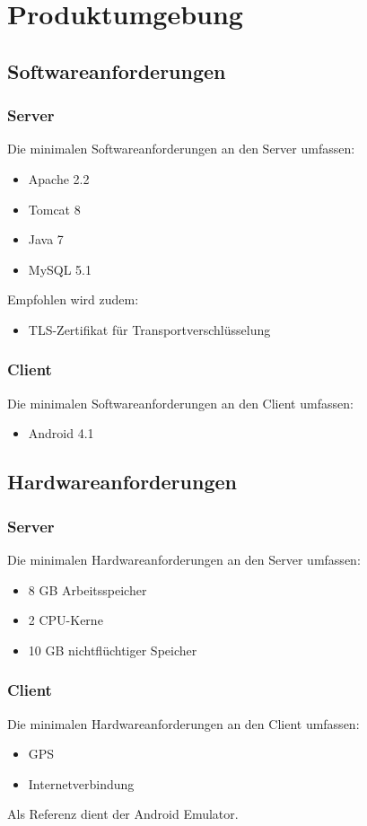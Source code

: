 \section{Produktumgebung}
\subsection{Softwareanforderungen}

\subsubsection{Server}
Die minimalen Softwareanforderungen an den Server umfassen:
\begin{itemize}
\item Apache 2.2
\item Tomcat 8
\item Java 7
\item MySQL 5.1

\end{itemize}

Empfohlen wird zudem:
\begin{itemize}
\item TLS-Zertifikat für Transportverschlüsselung
\end{itemize}

\subsubsection{Client}
Die minimalen Softwareanforderungen an den Client umfassen:
\begin{itemize}
\item Android 4.1

\end{itemize}


\subsection{Hardwareanforderungen}
\subsubsection{Server}
Die minimalen Hardwareanforderungen an den Server umfassen:
\begin{itemize}
\item 8 GB Arbeitsspeicher
\item 2 CPU-Kerne
\item 10 GB nichtflüchtiger Speicher
\end{itemize}

\subsubsection{Client}
Die minimalen Hardwareanforderungen an den Client umfassen:
\begin{itemize}
\item GPS
\item Internetverbindung
\end{itemize}

Als Referenz dient der Android Emulator.

